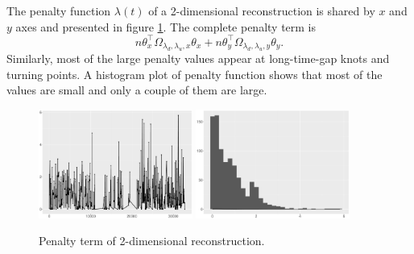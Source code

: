 The penalty function $\lambda(t)$ of a 2-dimensional reconstruction is shared by $x$ and $y$ axes and presented in figure \ref{2dpenalty}. The complete penalty term is 
\begin{equation*}
n\theta_x^\top\Omega_{\lambda_d,\lambda_u,x}\theta_x + n\theta_y^\top\Omega_{\lambda_d,\lambda_u,y}\theta_y.
\end{equation*}
Similarly, most of the large penalty values appear at long-time-gap knots and turning points. A histogram plot of penalty function shows that most of the values are small and only a couple of them are large. 
\begin{figure}
  \centering
    \includegraphics[width=0.45\textwidth]{Chapters/02TractorSplineTheory/plot/ggplot/ggRealdataXYPenaltyLine2.pdf}
    \includegraphics[width=0.45\textwidth]{Chapters/02TractorSplineTheory/plot/ggplot/ggRealdataXYPenaltyHist2.pdf} 
  \caption{Penalty term of 2-dimensional reconstruction.}\label{2dpenalty}
\end{figure}



